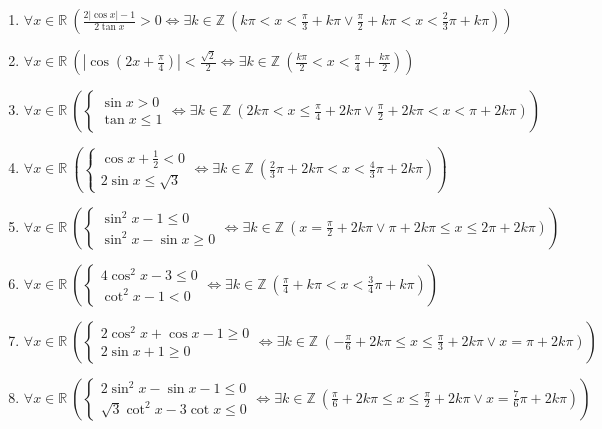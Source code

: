 \documentclass[11pt,a4paper]{article}
\begin{document}
\begin{enumerate}
\item $\displaystyle \forall x \in \mathbb{R}\ \left( \frac{2\left|\cos x\right| - 1}{2\tan x} > 0 \iff \exists k \in \mathbb{Z}\ \left( k\pi < x < \frac{\pi}{3} + k\pi \lor \frac{\pi}{2} + k\pi < x < \frac{2}{3}\pi + k\pi \right) \right)$
\item $\displaystyle \forall x \in \mathbb{R}\ \left( \left|\cos\left(2x + \frac{\pi}{4}\right)\right| < \frac{\sqrt{2}}{2} \iff \exists k \in \mathbb{Z}\ \left( \frac{k\pi}{2} < x < \frac{\pi}{4} + \frac{k\pi}{2} \right) \right)$
\item $\displaystyle \forall x \in \mathbb{R}\ \left( \begin{cases} \sin x > 0 \\ \tan x \le 1 \end{cases} \iff \exists k \in \mathbb{Z}\ \left( 2k\pi < x \le \frac{\pi}{4} + 2k\pi \lor \frac{\pi}{2} + 2k\pi < x < \pi + 2k\pi \right) \right)$
\item $\displaystyle \forall x \in \mathbb{R}\ \left( \begin{cases} \cos x + \frac{1}{2} < 0 \\ 2\sin x \le \sqrt{3} \end{cases} \iff \exists k \in \mathbb{Z}\ \left( \frac{2}{3}\pi + 2k\pi < x < \frac{4}{3}\pi + 2k\pi \right) \right)$
\item $\displaystyle \forall x \in \mathbb{R}\ \left( \begin{cases} \sin^{2} x - 1 \le 0 \\ \sin^{2} x - \sin x \ge 0 \end{cases} \iff \exists k \in \mathbb{Z}\ \left( x = \frac{\pi}{2} + 2k\pi \lor \pi + 2k\pi \le x \le 2\pi + 2k\pi \right) \right)$
\item $\displaystyle \forall x \in \mathbb{R}\ \left( \begin{cases} 4\cos^{2} x - 3 \le 0 \\ \cot^{2} x - 1 < 0 \end{cases} \iff \exists k \in \mathbb{Z}\ \left( \frac{\pi}{4} + k\pi < x < \frac{3}{4}\pi + k\pi \right) \right)$
\item $\displaystyle \forall x \in \mathbb{R}\ \left( \begin{cases} 2\cos^{2} x + \cos x - 1 \ge 0 \\ 2\sin x + 1 \ge 0 \end{cases} \iff \exists k \in \mathbb{Z}\ \left( -\frac{\pi}{6} + 2k\pi \le x \le \frac{\pi}{3} + 2k\pi \lor x = \pi + 2k\pi \right) \right)$
\item $\displaystyle \forall x \in \mathbb{R}\ \left( \begin{cases} 2\sin^{2} x - \sin x - 1 \le 0 \\ \sqrt{3}\cot^{2} x - 3\cot x \le 0 \end{cases} \iff \exists k \in \mathbb{Z}\ \left( \frac{\pi}{6} + 2k\pi \le x \le \frac{\pi}{2} + 2k\pi \lor x = \frac{7}{6}\pi + 2k\pi \right) \right)$
\end{enumerate}
\end{document}
